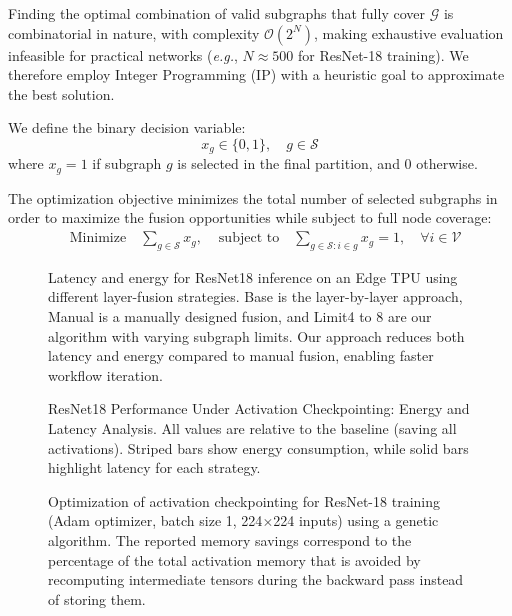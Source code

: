 \documentclass[lettersize,journal]{IEEEtran}
\begin{document}
Finding the optimal combination of valid subgraphs that fully cover $\mathcal{G}$ is combinatorial in nature, with complexity $\mathcal{O}(2^N)$, making exhaustive evaluation infeasible for practical networks (\emph{e.g.}, $N \approx 500$ for ResNet-18 training). We therefore employ Integer Programming (IP) with a heuristic goal to approximate the best solution. 

We define the binary decision variable:
\[
x_g \in \{0,1\}, \quad g \in \mathcal{S}
\]
where $x_g = 1$ if subgraph $g$ is selected in the final partition, and $0$ otherwise.

The optimization objective minimizes the total number of selected subgraphs in order to maximize the fusion opportunities while subject to full node coverage:
\[
\begin{aligned}
&\text{Minimize} \quad  \sum_{g \in \mathcal{S}} x_g, & \text{ subject to} \quad  \sum_{g \in \mathcal{S}: i \in g} x_g = 1, \quad \forall i \in \mathcal{V}
\end{aligned}
\]

\begin{figure}[ht!]
    \centering
    \resizebox{\linewidth}{!}{}
    \caption{Latency and energy for ResNet18 inference on an Edge TPU using different layer-fusion strategies. Base is the layer-by-layer approach, Manual is a manually designed fusion, and Limit4 to 8 are our algorithm with varying subgraph limits. Our approach reduces both latency and energy compared to manual fusion, enabling faster workflow iteration.}
    \label{fig:layerfusion}
\end{figure}

\begin{figure}[hb!]
\centering
\resizebox{\linewidth}{!}{}
\caption{ResNet18 Performance Under Activation Checkpointing: Energy and Latency Analysis.
All values are relative to the baseline (saving all activations). Striped bars show energy consumption, while solid bars highlight latency for each strategy.}
\label{fig:resnetnonlinearity}
\end{figure}

\begin{figure}[h!t]
\centering
\resizebox{\linewidth}{!}{}
\caption{Optimization of activation checkpointing for ResNet-18 training (Adam optimizer, batch size 1, 224$\times$224 inputs) using a genetic algorithm. The reported memory savings correspond to the percentage of the total activation memory that is avoided by recomputing intermediate tensors during the backward pass instead of storing them.}
\label{fig:GA_AC}
\end{figure}
\end{document}
